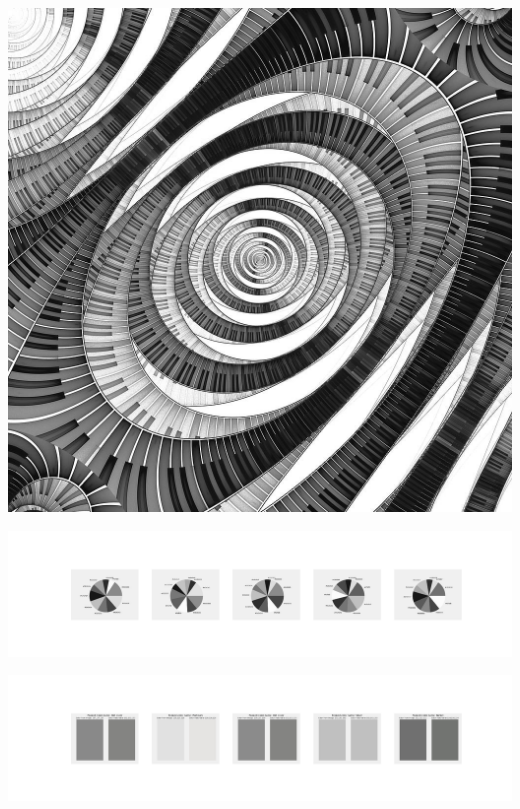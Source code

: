 \documentclass[11pt]{article}
\begin{document}
\begin{landscape}
    \begin{center}
    \includegraphics[width=\textwidth]{./nbimg/file (348).jpg}
    \end{center}

    \begin{center}
    \includegraphics[width=250mm]{./nbimg/pie-276.jpg}
    \end{center}

    \begin{center}
    \includegraphics[width=250mm]{./nbimg/peak-276.jpg}
    \end{center}
    


\end{landscape}
\end{document}
